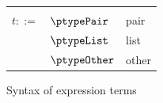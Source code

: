 \begin{figure}
   {\small
   \begin{minipage}[t]{0.48\textwidth}
   \begin{tabularx}{\textwidth}{rL{2.8cm}L{3cm}}
      &&
      \lowlight{$\PattConstrType$}
      \\
      $t::=$
      &
      $\ptypePair$
      &
      pair
      \\
      &
      $\ptypeList$
      &
      list
      \\
      &
      $\ptypeOther$
      &
      other
      \end{tabularx}
      \end{minipage}
   }
   \caption{Syntax of expression terms}
\end{figure}
 \clearpage

